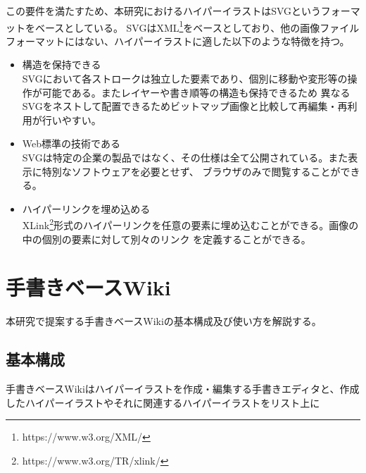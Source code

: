 この要件を満たすため、本研究におけるハイパーイラストはSVG\cite{aboutsvg}というフォーマットをベースとしている。
SVGはXML\footnote{https://www.w3.org/XML/}をベースとしており、他の画像ファイルフォーマットにはない、ハイパーイラストに適した以下のような特徴を持つ。
\begin{itemize}
    \item 構造を保持できる\\
    SVGにおいて各ストロークは独立した要素であり、個別に移動や変形等の操作が可能である。またレイヤーや書き順等の構造も保持できるため
    異なるSVGをネストして配置できるためビットマップ画像と比較して再編集・再利用が行いやすい。
    \item Web標準の技術である\\
    SVGは特定の企業の製品ではなく、その仕様は全て公開されている。また表示に特別なソフトウェアを必要とせず、
    ブラウザのみで閲覧することができる。
    \item ハイパーリンクを埋め込める\\
    XLink\footnote{https://www.w3.org/TR/xlink/}形式のハイパーリンクを任意の要素に埋め込むことができる。画像の中の個別の要素に対して別々のリンク
    を定義することができる。
\end{itemize}

\section{手書きベースWiki}
本研究で提案する手書きベースWikiの基本構成及び使い方を解説する。

\subsection{基本構成}
手書きベースWikiはハイパーイラストを作成・編集する手書きエディタと、作成したハイパーイラストやそれに関連するハイパーイラストをリスト上に